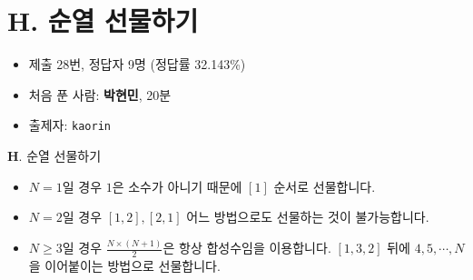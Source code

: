 \section{H. 순열 선물하기}

\begin{frame} %
    \begin{itemize}
        \item 제출 28번, 정답자 9명 (정답률 32.143\%)
        \item 처음 푼 사람: \textbf{박현민}, 20분
        \item 출제자: \texttt{kaorin}
    \end{itemize}
\end{frame}

\begin{frame}{\textbf{H}. 순열 선물하기}
    \begin{itemize}
        \item $N=1$일 경우 $1$은 소수가 아니기 때문에 $[1]$ 순서로 선물합니다.
        \item $N=2$일 경우 $[1, 2], [2, 1]$ 어느 방법으로도 선물하는 것이 불가능합니다.
        \item $N\geq3$일 경우 $\frac{N \times (N + 1)}{2}$은 항상 합성수임을 이용합니다. $[1, 3, 2]$ 뒤에 $4, 5, \cdots, N$을 이어붙이는 방법으로 선물합니다.
    \end{itemize}
\end{frame}